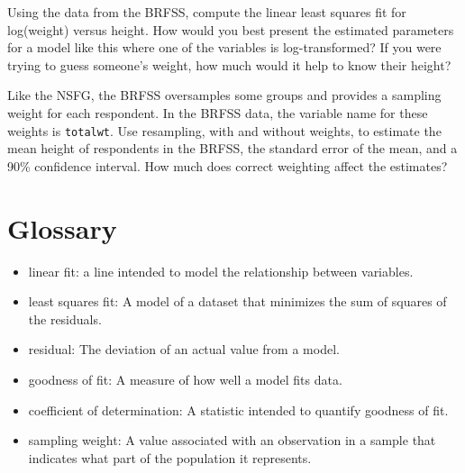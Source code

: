 \begin{exercise}

Using the data from the BRFSS, compute the linear least squares
fit for log(weight) versus height.
How would you best present the estimated parameters for a model
like this where one of the variables is log-transformed?
If you were trying to guess
someone's weight, how much would it help to know their height?

Like the NSFG, the BRFSS oversamples some groups and provides
a sampling weight for each respondent.  In the BRFSS data, the variable
name for these weights is {\tt totalwt}.
Use resampling, with and without weights, to estimate the mean height
of respondents in the BRFSS, the standard error of the mean, and a
90\% confidence interval.  How much does correct weighting affect the
estimates?
\end{exercise}


\section{Glossary}

\begin{itemize}

\item linear fit: a line intended to model the relationship between
variables.  

\item least squares fit: A model of a dataset that minimizes the
sum of squares of the residuals.

\item residual: The deviation of an actual value from a model.

\item goodness of fit: A measure of how well a model fits data.

\item coefficient of determination: A statistic intended to
quantify goodness of fit.

\item sampling weight: A value associated with an observation in a
  sample that indicates what part of the population it represents.

\end{itemize}

